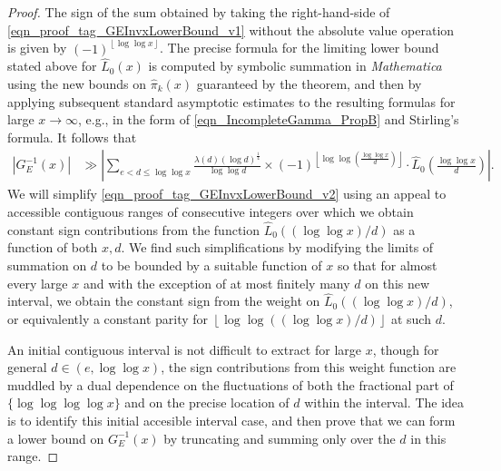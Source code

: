 \documentclass[11pt,reqno,a4letter]{article}
\numberwithin{figure}{section}
\numberwithin{table}{section}
\newcommand{\floor}[1]{\left\lfloor #1 \right\rfloor}
\theoremstyle{plain}
\numberwithin{theorem}{section}
\theoremstyle{definition}
\begin{document}
\begin{proof}
The sign of the sum obtained by taking the right-hand-side of 
\eqref{eqn_proof_tag_GEInvxLowerBound_v1} without the 
absolute value operation is given by $(-1)^{\floor{\log\log x}}$. 
The precise formula for the 
limiting lower bound stated above for $\widehat{L}_0(x)$ is computed by symbolic summation 
in \emph{Mathematica} using the new bounds on $\widehat{\pi}_k(x)$ guaranteed by 
the theorem, and then by applying subsequent standard asymptotic estimates to the 
resulting formulas for large $x \rightarrow \infty$, e.g., 
in the form of \eqref{eqn_IncompleteGamma_PropB} and Stirling's formula. 
It follows that 
\begin{align} 
\label{eqn_proof_tag_GEInvxLowerBound_v2} 
|G_E^{-1}(x)| & \gg \left\lvert \sum_{e < d \leq \log\log x} 
     \frac{\lambda(d) (\log d)^{\frac{1}{4}}}{\log\log d} \times 
     (-1)^{\floor{\log\log\left(\frac{\log\log x}{d}\right)}} \cdot 
     \widehat{L}_0\left(\frac{\log\log x}{d}\right) \right\rvert. 
\end{align} 
We will simplify \eqref{eqn_proof_tag_GEInvxLowerBound_v2} using an appeal to accessible contiguous 
ranges of consecutive integers over which we obtain constant sign contributions from the 
function $\widehat{L}_0((\log\log x) / d)$ as a function of both $x,d$. 
We find such simplifications 
by modifying the limits of summation on $d$ to be bounded by a 
suitable function of $x$ so that for almost every large $x$ and with the exception of at most 
finitely many $d$ on this new interval, we obtain the constant sign from the weight on 
$\widehat{L}_0\left((\log\log x) / d\right)$, or equivalently a constant parity for 
$\floor{\log\log\left((\log\log x) / d\right)}$ at such $d$. 

An initial contiguous interval is not difficult to extract for large $x$, though for 
general $d \in (e, \log\log x)$, the sign contributions from this weight function are muddled 
by a dual dependence on the fluctuations of both the fractional part of 
$\{\log\log\log\log x\}$ and on the precise location of $d$ within the interval. 
The idea is to identify this initial accesible interval case, and then prove that we can 
form a lower bound on $G_E^{-1}(x)$ by truncating and summing only over the $d$ in this range. 


\end{proof}
\end{document}
